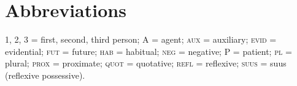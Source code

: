 \documentclass[output=paper]{LSP/langsci}
\begin{document}
\section*{Abbreviations}

1, 2, 3 = first, second, third person; A = agent; \textsc{aux} = auxiliary; \textsc{evid} = evidential; \textsc{fut} = future; \textsc{hab} = habitual; \textsc{neg} = negative; P = patient; \textsc{pl} = plural; \textsc{prox} = proximate; \textsc{quot} = quotative; \textsc{refl} = reflexive; \textsc{suus} = suus (reflexive possessive). 

{\sloppy
\printbibliography[heading=subbibliography,notkeyword=this]
}
\end{document}
